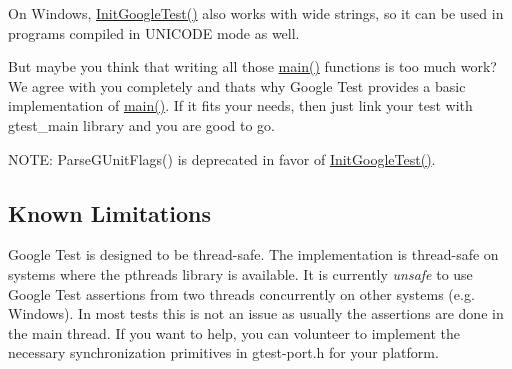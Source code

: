 On Windows, {\ttfamily \mbox{\hyperlink{namespacetesting_afd726ae08c9bd16dc52f78c822d9946b}{Init\+Google\+Test()}}} also works with wide strings, so it can be used in programs compiled in {\ttfamily U\+N\+I\+C\+O\+DE} mode as well.

But maybe you think that writing all those \mbox{\hyperlink{_be_01vektoriaus_2main_8cpp_ae66f6b31b5ad750f1fe042a706a4e3d4}{main()}} functions is too much work? We agree with you completely and that\textquotesingle{}s why Google Test provides a basic implementation of \mbox{\hyperlink{_be_01vektoriaus_2main_8cpp_ae66f6b31b5ad750f1fe042a706a4e3d4}{main()}}. If it fits your needs, then just link your test with gtest\+\_\+main library and you are good to go.

N\+O\+TE\+: {\ttfamily Parse\+G\+Unit\+Flags()} is deprecated in favor of {\ttfamily \mbox{\hyperlink{namespacetesting_afd726ae08c9bd16dc52f78c822d9946b}{Init\+Google\+Test()}}}.

\subsection*{Known Limitations}


\begin{DoxyItemize}
\item Google Test is designed to be thread-\/safe. The implementation is thread-\/safe on systems where the {\ttfamily pthreads} library is available. It is currently {\itshape unsafe} to use Google Test assertions from two threads concurrently on other systems (e.\+g. Windows). In most tests this is not an issue as usually the assertions are done in the main thread. If you want to help, you can volunteer to implement the necessary synchronization primitives in {\ttfamily gtest-\/port.\+h} for your platform. 
\end{DoxyItemize}